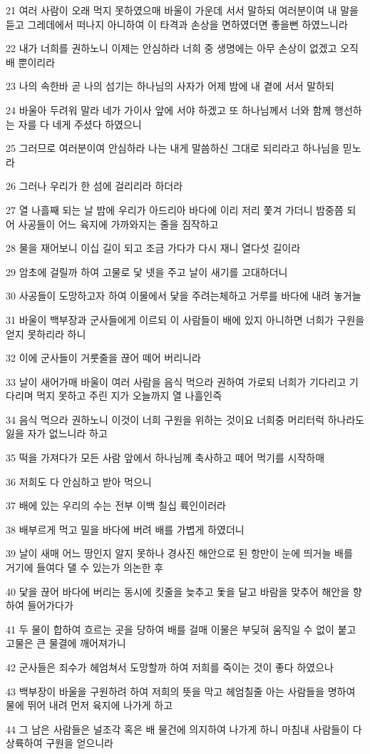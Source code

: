 \par 21 여러 사람이 오래 먹지 못하였으매 바울이 가운데 서서 말하되 여러분이여 내 말을 듣고 그레데에서 떠나지 아니하여 이 타격과 손상을 면하였더면 좋을뻔 하였느니라
\par 22 내가 너희를 권하노니 이제는 안심하라 너희 중 생명에는 아무 손상이 없겠고 오직 배 뿐이리라
\par 23 나의 속한바 곧 나의 섬기는 하나님의 사자가 어제 밤에 내 곁에 서서 말하되
\par 24 바울아 두려워 말라 네가 가이사 앞에 서야 하겠고 또 하나님께서 너와 함께 행선하는 자를 다 네게 주셨다 하였으니
\par 25 그러므로 여러분이여 안심하라 나는 내게 말씀하신 그대로 되리라고 하나님을 믿노라
\par 26 그러나 우리가 한 섬에 걸리리라 하더라
\par 27 열 나흘째 되는 날 밤에 우리가 아드리아 바다에 이리 저리 쫓겨 가더니 밤중쯤 되어 사공들이 어느 육지에 가까와지는 줄을 짐작하고
\par 28 물을 재어보니 이십 길이 되고 조금 가다가 다시 재니 열다섯 길이라
\par 29 암초에 걸릴까 하여 고물로 닻 넷을 주고 날이 새기를 고대하더니
\par 30 사공들이 도망하고자 하여 이물에서 닻을 주려는체하고 거루를 바다에 내려 놓거늘
\par 31 바울이 백부장과 군사들에게 이르되 이 사람들이 배에 있지 아니하면 너희가 구원을 얻지 못하리라 하니
\par 32 이에 군사들이 거룻줄을 끊어 떼어 버리니라
\par 33 날이 새어가매 바울이 여러 사람을 음식 먹으라 권하여 가로되 너희가 기다리고 기다리며 먹지 못하고 주린 지가 오늘까지 열 나흘인즉
\par 34 음식 먹으라 권하노니 이것이 너희 구원을 위하는 것이요 너희중 머리터럭 하나라도 잃을 자가 없느니라 하고
\par 35 떡을 가져다가 모든 사람 앞에서 하나님께 축사하고 떼어 먹기를 시작하매
\par 36 저희도 다 안심하고 받아 먹으니
\par 37 배에 있는 우리의 수는 전부 이백 칠십 륙인이러라
\par 38 배부르게 먹고 밀을 바다에 버려 배를 가볍게 하였더니
\par 39 날이 새매 어느 땅인지 알지 못하나 경사진 해안으로 된 항만이 눈에 띄거늘 배를 거기에 들여다 댈 수 있는가 의논한 후
\par 40 닻을 끊어 바다에 버리는 동시에 킷줄을 늦추고 돛을 달고 바람을 맞추어 해안을 향하여 들어가다가
\par 41 두 물이 합하여 흐르는 곳을 당하여 배를 걸매 이물은 부딪혀 움직일 수 없이 붙고 고물은 큰 물결에 깨어져가니
\par 42 군사들은 죄수가 헤엄쳐서 도망할까 하여 저희를 죽이는 것이 좋다 하였으나
\par 43 백부장이 바울을 구원하려 하여 저희의 뜻을 막고 헤엄칠줄 아는 사람들을 명하여 물에 뛰어 내려 먼저 육지에 나가게 하고
\par 44 그 남은 사람들은 널조각 혹은 배 물건에 의지하여 나가게 하니 마침내 사람들이 다 상륙하여 구원을 얻으니라

